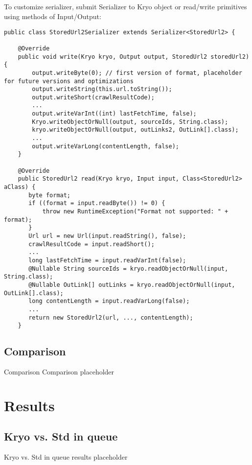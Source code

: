 \documentclass[8pt]{beamer}
\begin{document}
\subsection{\partname}
\begin{frame}[fragile]{\partname}

To customize serializer, submit Serializer to Kryo object or
read/write primitives using methods of Input/Output:

 \begin{verbatim}
public class StoredUrl2Serializer extends Serializer<StoredUrl2> {

    @Override
    public void write(Kryo kryo, Output output, StoredUrl2 storedUrl2) {
        output.writeByte(0); // first version of format, placeholder for future versions and optimizations
        output.writeString(this.url.toString());
        output.writeShort(crawlResultCode);
        ...
        output.writeVarInt((int) lastFetchTime, false);
        Kryo.writeObjectOrNull(output, sourceIds, String.class);
        kryo.writeObjectOrNull(output, outLinks2, OutLink[].class);
        ...
        output.writeVarLong(contentLength, false);
    }

    @Override
    public StoredUrl2 read(Kryo kryo, Input input, Class<StoredUrl2> aClass) {
       byte format;
       if ((format = input.readByte()) != 0) {
           throw new RuntimeException("Format not supported: " + format);
       }
       Url url = new Url(input.readString(), false);
       crawlResultCode = input.readShort();
       ...
       long lastFetchTime = input.readVarInt(false);
       @Nullable String sourceIds = kryo.readObjectOrNull(input, String.class);
       @Nullable OutLink[] outLinks = kryo.readObjectOrNull(input, OutLink[].class);
       long contentLength = input.readVarLong(false);
       ...
       return new StoredUrl2(url, ..., contentLength);
    }
 \end{verbatim}

\end{frame}


\renewcommand{\partname}{Comparison}
\subsection{\partname}
\begin{frame}{\partname}
  Comparison placeholder
\end{frame}

\section{Results}
\renewcommand{\partname}{Kryo vs. Std in queue}
\subsection{\partname}
\begin{frame}{\partname}
  results placeholder
\end{frame}
\end{document}
